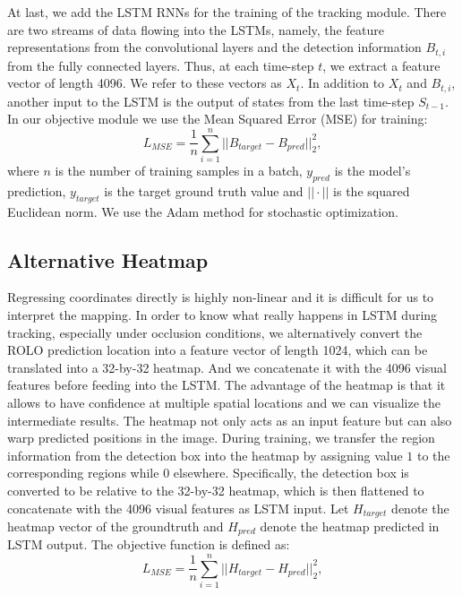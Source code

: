 \documentclass{article}
\begin{document}
At last, we add the LSTM RNNs for the training of the tracking module. There are two streams of data flowing into the LSTMs, namely, the feature representations from the convolutional layers and the detection information $B_{t,i}$ from the fully connected layers.
Thus, at each time-step $t$, we extract a feature vector of length 4096. We refer to these vectors as $X_{t}$. In addition to $X_{t}$ and $B_{t,i}$, another input to the LSTM is the output of states from the last time-step $S_{t-1}$.
In our objective module we use the Mean Squared Error (MSE) for training:
\begin{equation}
L_{MSE} = \frac{1}{n} \sum_{i=1}^{n} ||B_{target} - B_{pred} ||_{2}^{2},
\end{equation}
where $n$ is the number of training samples in a batch, $y_{pred}$ is the model’s prediction, $y_{target}$ is the target ground truth value and $||\cdot||$ is the squared Euclidean norm. We use the Adam method for stochastic optimization.

\subsection{Alternative Heatmap}
Regressing coordinates directly is highly non-linear and it is difficult for us to interpret the mapping.
In order to know what really happens in LSTM during tracking, especially under occlusion conditions, we alternatively convert the ROLO prediction location into a feature vector of length 1024, which can be translated into a 32-by-32 heatmap.
And we concatenate it with the 4096 visual features before feeding into the LSTM.
The advantage of the heatmap is that it allows to have confidence at multiple spatial locations and we can visualize the intermediate results.
The heatmap not only acts as an input feature but can also warp predicted positions in the image.
During training, we transfer the region information from the detection box into the heatmap by assigning value $1$ to the corresponding regions while $0$ elsewhere. Specifically, the detection box is converted to be relative to the 32-by-32 heatmap, which is then flattened to concatenate with the 4096 visual features as LSTM input.
Let $H_{target}$ denote the heatmap vector of the groundtruth and $H_{pred}$ denote the heatmap predicted in LSTM output. The objective function is defined as:
\begin{equation}
	L_{MSE} = \frac{1}{n} \sum_{i=1}^{n} ||H_{target} - H_{pred} ||_{2}^{2},
\end{equation}
\end{document}
